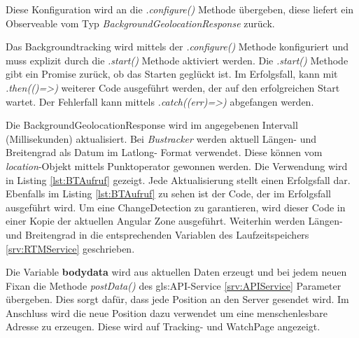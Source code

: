 Diese Konfiguration wird an die \emph{.configure()} Methode übergeben, diese liefert ein Observeable vom Typ \emph{BackgroundGeolocationResponse} zurück. 

Das Backgroundtracking wird mittels der \emph{.configure()} Methode konfiguriert und muss explizit durch die \emph{.start()} Methode aktiviert werden. Die \emph{.start()} Methode gibt ein Promise zurück, ob das Starten geglückt ist. Im Erfolgsfall, kann mit \emph{.then(()=>{})} weiterer Code ausgeführt werden, der auf den erfolgreichen Start wartet. Der Fehlerfall kann mittels \emph{.catch((err)=>{})} abgefangen werden. 

Die BackgroundGeolocationResponse wird im angegebenen Intervall (Millisekunden) aktualisiert. Bei \emph{Bustracker} werden aktuell Längen- und Breitengrad als Datum im Latlong- Format verwendet. Diese können vom \emph{location}-Objekt mittels Punktoperator gewonnen werden. Die Verwendung wird in Listing \ref{lst:BTAufruf} gezeigt. Jede Aktualisierung stellt einen Erfolgsfall dar. Ebenfalls im Listing \ref{lst:BTAufruf} zu sehen ist der Code, der im Erfolgsfall ausgeführt wird. Um eine ChangeDetection zu garantieren, wird dieser Code in einer Kopie der aktuellen Angular Zone ausgeführt. Weiterhin werden Längen- und Breitengrad in die entsprechenden Variablen des Laufzeitspeichers \ref{srv:RTMService} geschrieben. 

Die Variable \textbf{bodydata} wird aus aktuellen Daten erzeugt und bei jedem neuen \glqq Fix\grqq an die Methode \emph{postData()} des \gls{gls:API}-Service \ref{srv:APIService} Parameter übergeben. Dies sorgt dafür, dass jede Position an den Server gesendet wird. Im Anschluss wird die neue Position dazu verwendet um eine \glqq menschenlesbare \grqq Adresse zu erzeugen. Diese wird auf Tracking- und WatchPage angezeigt.

